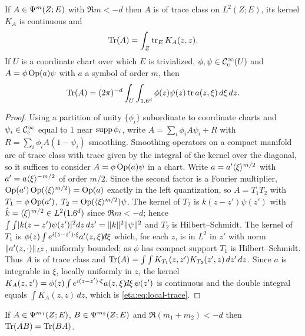 \begin{lemma}\label{eta:lem:trace-class}
If $A\in\Psi^{m}(Z;E)$ with $\Re m<-d$ then $A$ is of trace class on $L^2(Z;E)$, its
kernel $K_A$ is continuous and
\[
\operatorname{Tr}(A)=\int_Z\operatorname{tr}_E K_A(z,z).
\]
If $U$ is a coordinate chart over which $E$ is trivialized,
$\phi,\psi\in\mathcal{C}^\infty_{\mathrm{c}}(U)$ and $A=\phi\operatorname{Op}(a)\psi$ with $a$ a symbol of order $m$, then
\begin{equation}\label{eta:eq:local-trace}
\operatorname{Tr}(A)=(2\pi)^{-d}\int_U\int_{1.6^d}\phi(z)\psi(z)\operatorname{tr} a(z,\xi)\,d\xi\,dz.
\end{equation}
\end{lemma}

\begin{proof} Using a partition of unity $\{\phi_i\}$ subordinate to coordinate
charts and $\psi_i\in\mathcal{C}^\infty_{\mathrm{c}}$ equal to $1$ near $\operatorname{supp}\phi_i$, write
$A=\sum_i\phi_iA\psi_i+R$ with $R=\sum_i\phi_iA(1-\psi_i)$ smoothing. Smoothing
operators on a compact manifold are of trace class with trace given by the integral
of the kernel over the diagonal, so it suffices to consider $A=\phi\operatorname{Op}(a)\psi$ in a
chart. Write $a=a'\langle \xi\rangle^{m/2}$ with $a'=a\langle \xi\rangle^{-m/2}$ of order $m/2$. Since the
second factor is a Fourier multiplier, $\operatorname{Op}(a')\operatorname{Op}(\langle \xi\rangle^{m/2})=\operatorname{Op}(a)$ exactly in the
left quantization, so $A=T_1T_2$ with $T_1=\phi\operatorname{Op}(a')$, $T_2=\operatorname{Op}(\langle \xi\rangle^{m/2})\psi$. The
kernel of $T_2$ is $k(z-z')\psi(z')$ with $\hat k=\langle \xi\rangle^{m/2}\in L^2(1.6^d)$ since
$\Re m<-d$; hence $\int\int\lvert k(z-z')\psi(z')\rvert^2dz\,dz'=\lVert k\rVert^2\lVert \psi\rVert^2$ and
$T_2$ is Hilbert--Schmidt. The kernel of $T_1$ is
$\phi(z)\int e^{i(z-z')\cdot\xi}a'(z,\xi)\dbar\xi$ which, for each $z$, is in $L^2$ in
$z'$ with norm $\lVert a'(z,\cdot)\rVert_{L^2}$, uniformly bounded; as $\phi$ has compact
support $T_1$ is Hilbert--Schmidt. Thus $A$ is of trace class and
$\operatorname{Tr}(A)=\int\int K_{T_1}(z,z')K_{T_2}(z',z)\,dz'\,dz$. Since $a$ is integrable in
$\xi$, locally uniformly in $z$, the kernel
$K_A(z,z')=\phi(z)\int e^{i(z-z')\cdot\xi}a(z,\xi)\dbar\xi\,\psi(z')$ is continuous and
the double integral equals $\int K_A(z,z)\,dz$, which is \eqref{eta:eq:local-trace}.
\end{proof}

\begin{lemma}\label{eta:lem:trace-property}
If $A\in\Psi^{m_1}(Z;E)$, $B\in\Psi^{m_2}(Z;E)$ and $\Re(m_1+m_2)<-d$ then
$\operatorname{Tr}(AB)=\operatorname{Tr}(BA)$.
\end{lemma}

